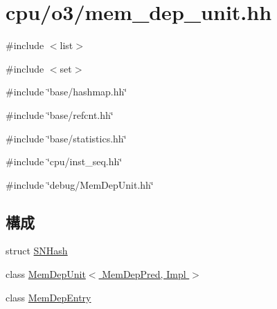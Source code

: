 \hypertarget{o3_2mem__dep__unit_8hh}{
\section{cpu/o3/mem\_\-dep\_\-unit.hh}
\label{o3_2mem__dep__unit_8hh}
}
{\ttfamily \#include $<$list$>$}\par
{\ttfamily \#include $<$set$>$}\par
{\ttfamily \#include \char`\"{}base/hashmap.hh\char`\"{}}\par
{\ttfamily \#include \char`\"{}base/refcnt.hh\char`\"{}}\par
{\ttfamily \#include \char`\"{}base/statistics.hh\char`\"{}}\par
{\ttfamily \#include \char`\"{}cpu/inst\_\-seq.hh\char`\"{}}\par
{\ttfamily \#include \char`\"{}debug/MemDepUnit.hh\char`\"{}}\par
\subsection*{構成}
\begin{DoxyCompactItemize}
\item 
struct \hyperlink{structSNHash}{SNHash}
\item 
class \hyperlink{classMemDepUnit}{MemDepUnit$<$ MemDepPred, Impl $>$}
\item 
class \hyperlink{classMemDepUnit_1_1MemDepEntry}{MemDepEntry}
\end{DoxyCompactItemize}
